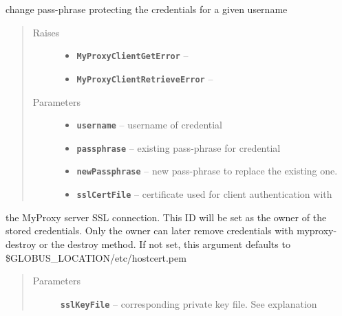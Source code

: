 \documentclass[letterpaper,10pt,english]{sphinxmanual}
\begin{document}
\begin{fulllineitems}
\begin{fulllineitems}
\end{fulllineitems}


\begin{fulllineitems}
\label{client:myproxy.client.MyProxyClient.changePassphrase}
change pass-phrase protecting the credentials for a given username
\begin{quote}\begin{description}
\item[{Raises}] \leavevmode\begin{itemize}
\item {} 
\textbf{\texttt{MyProxyClientGetError}} -- 

\item {} 
\textbf{\texttt{MyProxyClientRetrieveError}} -- 

\end{itemize}

\item[{Parameters}] \leavevmode\begin{itemize}
\item {} 
\textbf{\texttt{username}} -- username of credential

\item {} 
\textbf{\texttt{passphrase}} -- existing pass-phrase for credential

\item {} 
\textbf{\texttt{newPassphrase}} -- new pass-phrase to replace the existing one.

\item {} 
\textbf{\texttt{sslCertFile}} -- certificate used for client authentication with

\end{itemize}

\end{description}\end{quote}

the MyProxy server SSL connection.  This ID will be set as the owner
of the stored credentials.  Only the owner can later remove 
credentials with myproxy-destroy or the destroy method.  If not set,
this argument defaults to \$GLOBUS\_LOCATION/etc/hostcert.pem
\begin{quote}\begin{description}
\item[{Parameters}] \leavevmode
\textbf{\texttt{sslKeyFile}} -- corresponding private key file.  See explanation


\end{description}
\end{quote}
\end{fulllineitems}
\end{fulllineitems}
\end{document}
